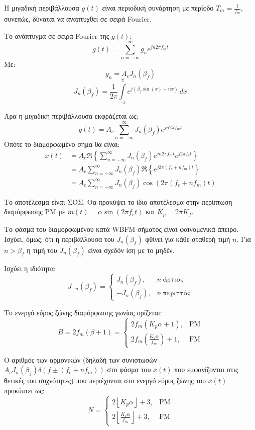 \documentclass[a4paper,12pt]{article}
\begin{document}
Η μιγαδική περιβάλλουσα \(g(t)\) είναι περιοδική συνάρτηση με περίοδο \(T_m = \frac{1}{f_m} \), συνεπώς, δύναται να αναπτυχθεί σε σειρά Fourier.

Το ανάπτυγμα σε σειρά Fourier της \(g(t)\):
\[
g(t)=\sum_{n=-\infty}^{\infty} g_n e^{jn2\pi f_m t}
\]
Με:
\[
g_n=A_c J_n(\beta_f)
\]
\[
J_n(\beta_f)=\frac{1}{2\pi} \int\limits_{-\pi}^{\pi} e^{j(\beta_f \sin(x)-nx)} \, dx
\]

Άρα η μιγαδική περιβάλλουσα εκφράζεται ως:
\[
g(t)=A_c \sum_{n=-\infty}^{\infty} J_n(\beta_f)e^{jn2\pi f_m t}
\]
Οπότε το διαμορφωμένο σήμα θα είναι:
\[
\begin{aligned}
x(t) & =A_c \Re\left\{\sum_{n=-\infty}^{\infty} J_n\left(\beta_f\right) e^{j n 2 \pi f_m t} e^{j 2 \pi f_c t}\right\} \\
& =A_c \sum_{n=-\infty}^{\infty} J_n\left(\beta_f\right) \Re\left\{e^{j 2 \pi\left(f_c+n f_m\right) t}\right\} \\
& =A_c \sum_{n=-\infty}^{\infty} J_n\left(\beta_f\right) \cos \left(2 \pi\left(f_c+n f_m\right) t\right)
\end{aligned}
\]

Το αποτέλεσμα είναι ΣΟΣ. Θα προκύψει το ίδιο αποτέλεσμα στην περίπτωση διαμόρφωσης PM με \(m(t)=\alpha \sin(2\pi f_c t)\) και \(K_p=2\pi K_f\).

Το φάσμα του διαμορφωμένου κατά WBFM σήματος είναι φαινομενικά άπειρο. Ισχύει, όμως, ότι η περιβάλλουσα του \(J_n(\beta_f)\) φθίνει για κάθε σταθερή τιμή \(n\). Για \(n>\beta_f\) η τιμή του \(J_n(\beta_f)\) είναι σχεδόν ίση με το μηδέν.

Ισχύει η ιδιότητα:
\[
J_{-n}\left(\beta_f\right)= \begin{cases}J_n\left(\beta_f\right), & n \ \text{άρτιος} \\ -J_n\left(\beta_f\right), & n \ \text{περιττός} \end{cases}
\]

Το ενεργό εύρος ζώνης διαμόρφωσης γωνίας ορίζεται:
\[
B=2 f_m(\beta+1)= \begin{cases}2 f_m\left(K_p \alpha+1\right), & \mathrm{PM} \\ 2 f_m\left(\frac{K_f \alpha}{f_m}\right)+1, & \mathrm{FM}\end{cases}
\]

Ο αριθμός των αρμονικών (δηλαδή των συνιστωσών \(A_c J_n(\beta_f)\delta(f \pm (f_c+nf_m))\) στο φάσμα του \(x(t)\) που εμφανίζονται στις θετικές του συχνότητες) που περιέχονται στο ενεργό εύρος ζώνης του \(x(t)\) προκύπτει ως:
\[
N= \begin{cases}2\left\lfloor K_p \alpha\right\rfloor+3, & \mathrm{PM} \\ 2\left\lfloor\frac{K_f \alpha}{f_m}\right\rfloor+3, & \mathrm{FM}\end{cases}
\]
\end{document}
